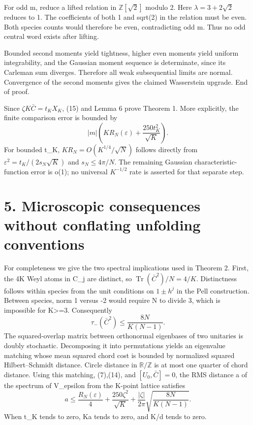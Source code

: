 \documentclass[11pt,a4paper]{article}
\begin{document}
For odd m, reduce a lifted relation in \(\mathbb Z[\sqrt2]\) modulo 2. Here \(\lambda=3+2\sqrt2\) reduces to 1. The coefficients of both 1 and sqrt(2) in the relation must be even. Both species counts would therefore be even, contradicting odd m. Thus no odd central word exists after lifting.

Bounded second moments yield tightness, higher even moments yield uniform integrability, and the Gaussian moment sequence is determinate, since its Carleman sum diverges. Therefore all weak subsequential limits are normal. Convergence of the second moments gives the claimed Wasserstein upgrade. End of proof.

Since \(\zeta K\bar C=t_KX_K\), (15) and Lemma 6 prove Theorem 1. More explicitly, the finite comparison error is bounded by \[
 |m|\left(KR_N(\varepsilon)+\frac{250t_K^2}{\sqrt K}\right).    \tag{18}
\] For bounded t\_K, \(KR_N=O(K^{1/4}/\sqrt N)\) follows directly from \(\varepsilon^2=t_K/(2s_N\sqrt K)\) and \(s_N\leq4\pi/N\). The remaining Gaussian characteristic-function error is o(1); no universal \(K^{-1/2}\) rate is asserted for that separate step.

\hypertarget{microscopic-consequences-without-conflating-unfolding-conventions}{%
\section{5. Microscopic consequences without conflating unfolding conventions}\label{microscopic-consequences-without-conflating-unfolding-conventions}}

For completeness we give the two spectral implications used in Theorem 2. First, the 4K Weyl atoms in C\_j are distinct, so \(\operatorname{Tr}(\bar C^2)/N=4/K\). Distinctness follows within species from the unit conditions on \(1\pm h^j\) in the Pell construction. Between species, norm 1 versus -2 would require N to divide 3, which is impossible for K\textgreater=3. Consequently \[
 \tau_-(\bar C^2)\leq\frac{8N}{K(N-1)}.
\] The squared-overlap matrix between orthonormal eigenbases of two unitaries is doubly stochastic. Decomposing it into permutations yields an eigenvalue matching whose mean squared chord cost is bounded by normalized squared Hilbert--Schmidt distance. Circle distance in \(\mathbb R/\mathbb Z\) is at most one quarter of chord distance. Using this matching, (7),(14), and \([U_0,\bar C]=0\), the RMS distance a of the spectrum of V\_epsilon from the K-point lattice satisfies \[
 a\leq\frac{R_N(\varepsilon)}4+
          \frac{250\zeta^2}{\sqrt K}+
          \frac{|\zeta|}{2\pi}\sqrt{\frac{8N}{K(N-1)}}.         \tag{19}
\] When t\_K tends to zero, Ka tends to zero, and K/d tends to zero.
\end{document}
